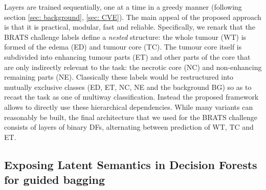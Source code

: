 Layers are trained sequentially, one at a time in a greedy manner (following section \ref{sec: background}, \ref{sec: CVE}). The main appeal of the proposed approach is that it is practical, modular, fast and reliable. %
Specifically, we renark that the BRATS challenge labels define a \textit{nested} structure: the whole tumour (WT) is formed of the edema (ED) and tumour core (TC). The tumour core itself is subdivided into enhancing tumour parts (ET) and other parts of the core that are only indirectly relevant to the task: the necrotic core (NC) and non-enhancing remaining parts (NE). Classically these labels would be restructured into mutually exclusive classes (ED, ET, NC, NE and the background BG) so as to recast the task as one of multiway classification. Instead the proposed framework allows to directly use these hierarchical dependencies. %
While many variants can reasonably be built, the final architecture that we used for the BRATS challenge consists of layers of binary DFs, alternating between prediction of WT, TC and ET.


\subsection{Exposing Latent Semantics in Decision Forests for guided bagging}
\label{sec: clustering}


